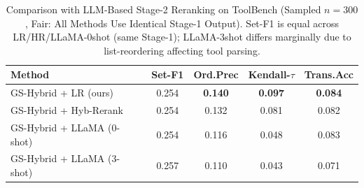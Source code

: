\begin{table}[!t]
\caption{Comparison with LLM-Based Stage-2 Reranking on ToolBench (Sampled $n=300$, Fair: All Methods Use Identical Stage-1 Output). Set-F1 is equal across LR/HR/LLaMA-0shot (same Stage-1); LLaMA-3shot differs marginally due to list-reordering affecting tool parsing.}
\label{tab:llm}
\centering
\small
\begin{tabular}{lcccc}
\toprule
\textbf{Method} & \textbf{Set-F1} & \textbf{Ord.Prec} & \textbf{Kendall-$\tau$} & \textbf{Trans.Acc} \\
\midrule
GS-Hybrid + LR (ours)       & 0.254 & \textbf{0.140} & \textbf{0.097} & \textbf{0.084} \\
GS-Hybrid + Hyb-Rerank      & 0.254 & 0.132 & 0.081 & 0.082 \\
GS-Hybrid + LLaMA (0-shot)  & 0.254 & 0.116 & 0.048 & 0.083 \\
GS-Hybrid + LLaMA (3-shot)  & 0.257 & 0.110 & 0.043 & 0.071 \\
\bottomrule
\end{tabular}
\end{table}
